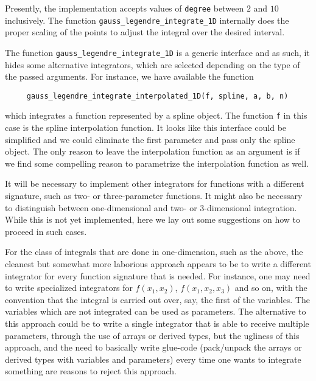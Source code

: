 \documentclass[]{report}   %
\begin{document}
Presently, the implementation accepts values of \verb+degree+ between $2$ and $10$ inclusively. The function \verb+gauss_legendre_integrate_1D+ internally does the proper scaling of the points to adjust the integral over the desired interval.

The function \verb+gauss_legendre_integrate_1D+ is a generic interface and as such, it hides some alternative integrators, which are selected depending on the type of the passed arguments.  For instance, we have available the function
\begin{verbatim}
     gauss_legendre_integrate_interpolated_1D(f, spline, a, b, n)
\end{verbatim} 
which integrates a function represented by a spline object. The function \verb+f+ in this case is the spline interpolation function. It looks like this interface could be simplified and we could eliminate the first parameter and pass only the spline object. The only reason to leave the interpolation function as an argument is if we find some compelling reason to parametrize the interpolation function as well. 

It will be necessary to implement other integrators for functions with a different signature, such as two- or three-parameter functions. It might also be necessary to distinguish between one-dimensional and two- or 3-dimensional integration. While this is not yet implemented, here we lay out some suggestions on how to proceed in such cases.

For the class of integrals that are done in one-dimension, such as the above, the cleanest but somewhat more laborious approach appears to be to write a different integrator for every function signature that is needed. For instance, one may need to write specialized integrators for $f(x_1, x_2)$, $f(x_1, x_2, x_3)$ and so on, with the convention that the integral is carried out over, say, the first of the variables. The variables which are not integrated can be used as parameters. The alternative to this approach could be to write a single integrator that is able to receive multiple parameters, through the use of arrays or derived types, but the ugliness of this approach, and the need to basically write glue-code (pack/unpack the arrays or derived types with variables and parameters) every time one wants to integrate something are reasons to reject this approach.
\end{document}
